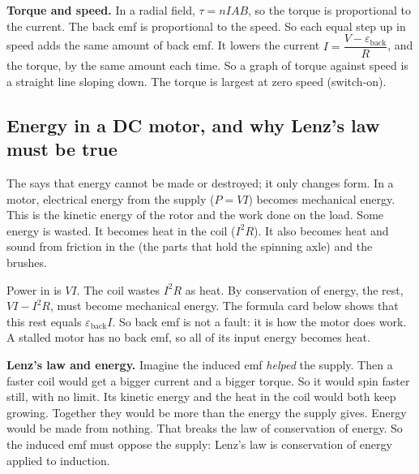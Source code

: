 \textbf{Torque and speed.} In a radial field, $\tau = nIAB$, so the torque is
proportional to the current. The back emf is proportional to the speed. So each equal
step up in speed adds the same amount of back emf. It lowers the current
$I = \dfrac{V - \varepsilon_\mathrm{back}}{R}$, and the torque, by the same amount each
time. So a graph of torque against speed is a straight line sloping down. The torque is
largest at zero speed (switch-on).

\subsection{Energy in a DC motor, and why Lenz's law must be true}
The  says that energy cannot be made or destroyed;
it only changes form. In a motor, electrical energy from the supply ($P = VI$) becomes
mechanical energy. This is the kinetic energy of the rotor and the work done on the
load. Some energy is wasted. It becomes heat in the coil ($I^2R$). It also becomes heat and sound from
friction in the  (the parts that hold the spinning axle) and the brushes.

Power in is $VI$. The coil wastes $I^2R$ as heat. By conservation of energy, the rest,
$VI - I^2R$, must become mechanical energy. The formula card below shows that this rest
equals $\varepsilon_\mathrm{back}I$. So back emf is not a fault: it is how the motor
does work. A stalled motor has no back emf, so all of its input energy becomes heat.

\textbf{Lenz's law and energy.} Imagine the induced emf \emph{helped} the supply. Then a
faster coil would get a bigger current and a bigger torque. So it would spin faster
still, with no limit. Its kinetic energy and the heat in the coil would both keep
growing. Together they would be more than the energy the supply gives. Energy would be
made from nothing. That breaks the law of conservation of energy. So the induced emf
must oppose the supply: Lenz's law is conservation of energy applied to induction.

